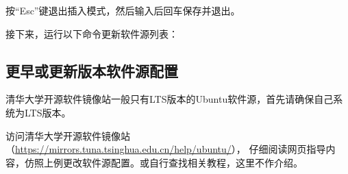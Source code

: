 按“Esc”键退出插入模式，然后输入后回车保存并退出。

接下来，运行以下命令更新软件源列表：

\subsection{更早或更新版本软件源配置}

清华大学开源软件镜像站一般只有LTS版本的Ubuntu软件源，首先请确保自己系统为LTS版本。

访问清华大学开源软件镜像站（\url{https://mirrors.tuna.tsinghua.edu.cn/help/ubuntu/}），
仔细阅读网页指导内容，仿照上例更改软件源配置。或自行查找相关教程，这里不作介绍。

